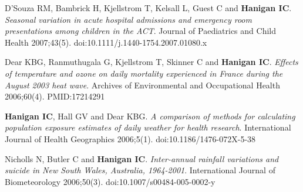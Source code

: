 \documentclass[a4paper,11pt]{article}
\begin{document}
\begin{revnumerate}
\item D’Souza RM, Bambrick H, Kjellstrom T, Kelsall L, Guest C and \textbf{Hanigan IC}. \emph{Seasonal variation in acute hospital admissions and emergency room presentations among children in the ACT}. Journal of Paediatrics and Child Health 2007;43(5). doi:10.1111/j.1440-1754.2007.01080.x

\item Dear KBG, Ranmuthugala G, Kjellstrom T, Skinner C and \textbf{Hanigan IC}. \emph{Effects of temperature and ozone on daily mortality experienced in France during the August 2003 heat wave}. Archives of Environmental and Occupational Health 2006;60(4). PMID:17214291

\item \textbf{Hanigan IC}, Hall GV and Dear KBG. \emph{A comparison of methods for calculating population exposure estimates of daily weather for health research}. International Journal of Health Geographics 2006;5(1). doi:10.1186/1476-072X-5-38

\item Nicholls N, Butler C and \textbf{Hanigan IC}. \emph{Inter-annual rainfall variations and suicide in New South Wales, Australia, 1964-2001}. International Journal of Biometeorology 2006;50(3). doi:10.1007/s00484-005-0002-y
\end{revnumerate}
\bigskip 
\end{document}
